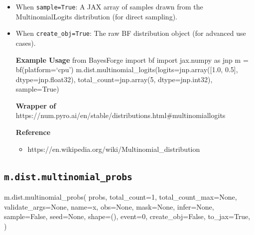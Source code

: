 \documentclass[
  letterpaper,
  DIV=11,
  numbers=noendperiod]{scrartcl}
\newenvironment{Shaded}{\begin{snugshade}}{\end{snugshade}}
\newcommand{\DecValTok}[1]{\textcolor[rgb]{0.68,0.00,0.00}{#1}}
\newcommand{\NormalTok}[1]{\textcolor[rgb]{0.00,0.23,0.31}{#1}}
\newcommand{\OperatorTok}[1]{\textcolor[rgb]{0.37,0.37,0.37}{#1}}
\newcommand{\StringTok}[1]{\textcolor[rgb]{0.13,0.47,0.30}{#1}}
\newcommand{\VariableTok}[1]{\textcolor[rgb]{0.07,0.07,0.07}{#1}}
\providecommand{\tightlist}{%
  \setlength{\itemsep}{0pt}\setlength{\parskip}{0pt}}\usepackage{longtable,booktabs,array}
\begin{document}
\begin{itemize}
\item
  When \texttt{sample=True}: A JAX array of samples drawn from the
  MultinomialLogits distribution (for direct sampling).
\item
  When \texttt{create\_obj=True}: The raw BF distribution object (for
  advanced use cases).

  \textbf{Example Usage} from BayesForge import bf import jax.numpy as
  jnp m = bf(platform=`cpu')
  m.dist.multinomial\_logits(logits=jnp.array({[}1.0, 0.5{]},
  dtype=jnp.float32), total\_count=jnp.array(5, dtype=jnp.int32),
  sample=True)

  \textbf{Wrapper of}
  https://num.pyro.ai/en/stable/distributions.html\#multinomiallogits

  \textbf{Reference}

  \begin{itemize}
  \tightlist
  \item
    https://en.wikipedia.org/wiki/Multinomial\_distribution
  \end{itemize}
\end{itemize}

\subsection{\texorpdfstring{\texttt{m.dist.multinomial\_probs}}{m.dist.multinomial\_probs}}\label{multinomial_probs}

\begin{Shaded}
\begin{Highlighting}[]
\NormalTok{m.dist.multinomial\_probs(}
\NormalTok{    probs,}
\NormalTok{    total\_count}\OperatorTok{=}\DecValTok{1}\NormalTok{,}
\NormalTok{    total\_count\_max}\OperatorTok{=}\VariableTok{None}\NormalTok{,}
\NormalTok{    validate\_args}\OperatorTok{=}\VariableTok{None}\NormalTok{,}
\NormalTok{    name}\OperatorTok{=}\StringTok{\textquotesingle{}x\textquotesingle{}}\NormalTok{,}
\NormalTok{    obs}\OperatorTok{=}\VariableTok{None}\NormalTok{,}
\NormalTok{    mask}\OperatorTok{=}\VariableTok{None}\NormalTok{,}
\NormalTok{    infer}\OperatorTok{=}\VariableTok{None}\NormalTok{,}
\NormalTok{    sample}\OperatorTok{=}\VariableTok{False}\NormalTok{,}
\NormalTok{    seed}\OperatorTok{=}\VariableTok{None}\NormalTok{,}
\NormalTok{    shape}\OperatorTok{=}\NormalTok{(),}
\NormalTok{    event}\OperatorTok{=}\DecValTok{0}\NormalTok{,}
\NormalTok{    create\_obj}\OperatorTok{=}\VariableTok{False}\NormalTok{,}
\NormalTok{    to\_jax}\OperatorTok{=}\VariableTok{True}\NormalTok{,}
\NormalTok{)}
\end{Highlighting}
\end{Shaded}
\end{document}
